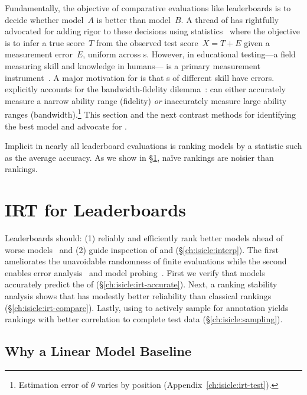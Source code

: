 Fundamentally, the objective of comparative evaluations like
leaderboards is to decide whether model~$A$ is better than model~$B$.
A thread of \nlp{} has rightfully advocated for adding rigor to these
decisions using statistics~\citep[Classical Testing
  Theory]{traub1997ctt} where the objective is to infer a true
score~$T$ from the observed test score~$X=T+E$ given a measurement
error~$E$, uniform across \subj{}s.
However, in educational testing---a field measuring skill and
knowledge in humans---\irt{} is a primary measurement
instrument~\citep[p.~2]{hambleton1991fundamentals}.
A major motivation for \irt{} is that \subj{}s of different skill have
 errors.
\irt{} explicitly accounts for the bandwidth-fidelity
dilemma~\citep{mcbride1976bandwidth}: \itms{} can either accurately
measure a narrow ability range (fidelity) \textit{or} inaccurately
measure large ability ranges (bandwidth).\footnote{Estimation error
  of $\theta$ varies by position (Appendix~\ref{ch:isicle:irt-test}).  }
This section and the next contrast methods for identifying the best
model and advocate for \irt{}.

\label{ch:isicle:agg}


Implicit in nearly all leaderboard evaluations is ranking models by a
statistic such as the average accuracy.
As we show in \S\ref{ch:isicle:exp}, na\"ive rankings are noisier than \irt{} rankings.
\section{IRT for Leaderboards}
\label{ch:isicle:exp}

Leaderboards should: (1) reliably and efficiently rank
better models ahead of worse
models~\citep{sutcliffe1992pragmatics,voorhees2003evaluating} and (2)
guide inspection of \itms{} and \subjs{} (\S\ref{ch:isicle:interp}).
The first ameliorates the unavoidable randomness
of finite evaluations while the second enables
error analysis~\citep{wu2019errudite} and model
probing~\citep{belinkov2019survey,zhang2019manifold}.
First we verify that \irt{} models accurately predict the \resps{} of
\subjs{} (\S\ref{ch:isicle:irt-accurate}).
Next, a ranking stability analysis shows that \irt{} has
modestly better reliability than classical rankings
(\S\ref{ch:isicle:irt-compare}).
Lastly, using \irt{} to actively sample \itms{} for annotation yields
rankings with better correlation to complete test data
(\S\ref{ch:isicle:sampling}).

\subsection{Why a Linear Model Baseline}

